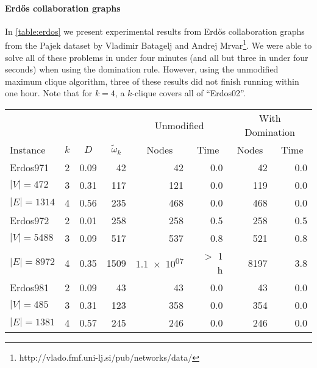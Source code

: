 \documentclass[letterpaper]{article}
\begin{document}
\paragraph{Erd\H{o}s collaboration graphs}

In \cref{table:erdos} we present experimental results from Erd\H{o}s
collaboration graphs from the Pajek dataset by Vladimir Batagelj and Andrej
Mrvar\footnote{http://vlado.fmf.uni-lj.si/pub/networks/data/}.  We were able to solve all of
these problems in under four minutes (and all but three in under four seconds) when using the
domination rule. However, using the unmodified maximum clique algorithm, three of these results did
not finish running within one hour. Note that for $k = 4$, a $k$-clique covers all of ``Erdos02''.

\begin{table}
    \scriptsize\setlength{\tabcolsep}{5pt} %
    \centering
    \begin{tabular}{l c rr rr rr}
        \toprule
        & & & & \multicolumn{2}{c}{Unmodified} & \multicolumn{2}{c}{With Domination} \\
    \cmidrule(lr){5-6}
    \cmidrule(lr){7-8}
    Instance & \multicolumn{1}{c}{$k$} & \multicolumn{1}{c}{$D$} & \multicolumn{1}{c}{$\tilde{\omega}_k$} &
    \multicolumn{1}{c}{Nodes} & \multicolumn{1}{c}{Time} &
    \multicolumn{1}{c}{Nodes} & \multicolumn{1}{c}{Time} \\
    \midrule
Erdos971  & 2&0.09&42&42&0.0&42&0.0\\
\hspace*{0.2em}\color{gray}$|V|{=}472$& 3&0.31&117&121&0.0&119&0.0\\
\hspace*{0.2em}\color{gray}$|E|{=}1314$& 4&0.56&235&468&0.0&468&0.0\\
Erdos972  & 2&0.01&258&258&0.5&258&0.5\\
\hspace*{0.2em}\color{gray}$|V|{=}5488$& 3&0.09&517&537&0.8&521&0.8\\
\hspace*{0.2em}\color{gray}$|E|{=}8972$& 4&0.35&1509&\color{gray}\num{1.1e+07}&\color{gray}$>$ 1 h&8197&3.8\\
Erdos981  & 2&0.09&43&43&0.0&43&0.0\\
\hspace*{0.2em}\color{gray}$|V|{=}485$& 3&0.31&123&358&0.0&354&0.0\\
\hspace*{0.2em}\color{gray}$|E|{=}1381$& 4&0.57&245&246&0.0&246&0.0\\

\end{tabular}
\end{table}
\end{document}
